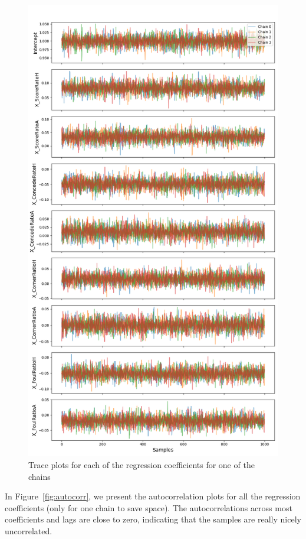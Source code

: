 \documentclass[9pt]{IEEEtran}
\begin{document}
\begin{figure}[h]
\centering
\includegraphics[width=1\columnwidth]{figures/trace.png}
\caption{Trace plots for each of the regression coefficients for one of the chains}
\label{fig:trace}
\end{figure}

In Figure~\ref{fig:autocorr}, we present the autocorrelation 
plots for all the regression coefficients 
(only for one chain to save space). The autocorrelations
 across most coefficients and lags are close to zero, 
 indicating that the samples are really nicely uncorrelated.
\end{document}
